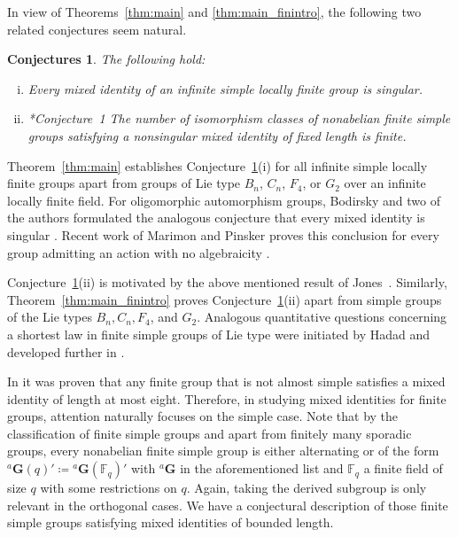 \documentclass[a4paper,12pt]{amsproc}
\theoremstyle{plain}
\newtheorem{conjsintro}[thmintro]{Conjectures}
\theoremstyle{definition}
\begin{document}
In view of Theorems~\ref{thm:main} and \ref{thm:main_finintro}, the following two related conjectures seem natural.

\begin{conjsintro}\label{conj:main_lfsg}
The following hold:
\begin{enumerate}[(i)]
\item Every mixed identity of an infinite simple locally finite group is singular.
\item \cite{bradfordschneiderthom2023non}*{Conjecture~1}
The number of isomorphism classes of nonabelian finite simple groups satisfying a nonsingular mixed identity of fixed length is finite.
\end{enumerate}
\end{conjsintro}

Theorem~\ref{thm:main} establishes Conjecture~\ref{conj:main_lfsg}(i) for all  infinite simple locally finite groups apart from  groups of Lie type $B_n$, $C_n$, $F_4$, or $G_2$ over an infinite locally finite field.
For oligomorphic automorphism groups, Bodirsky and two of the authors formulated the analogous conjecture that every mixed identity is singular \cite{bodirskyschneiderthom2025mixed}. Recent work of Marimon and Pinsker proves this conclusion for every group admitting an action with no algebraicity \cite{marimonpinsker2026all}.

Conjecture~\ref{conj:main_lfsg}(ii) is motivated by the above mentioned result of Jones~\cite{jones1974varieties}. Similarly, Theorem~\ref{thm:main_finintro} proves Conjecture~\ref{conj:main_lfsg}(ii) apart from simple groups of the Lie types $B_n, C_n, F_4$, and $G_2$. Analogous quantitative questions concerning a shortest law in finite
simple groups of Lie type were initiated by Hadad 
\cite{hadad2011shortest} and developed further in 
\cites{kozmathom2016divisibility,thom2017length,bradfordthom2026short}.

In \cite{bradfordschneiderthom2023length} it was proven that any finite group that is 
not almost simple satisfies a mixed identity of length at most eight. 
Therefore, in studying mixed identities for finite groups, attention naturally focuses 
on the simple case.
Note that by the classification of finite simple groups and apart from finitely many sporadic groups, every nonabelian finite simple group is either alternating or of the form ${}^a\mathbf{G}(q)'\coloneqq {}^a\mathbf{G}(\mathbb F_q)'$ with ${}^a\mathbf G$ in the aforementioned list and $\mathbb F_q$ a finite field of size $q$ with some restrictions on $q$. Again, taking the derived subgroup is only relevant in the orthogonal cases. We have a conjectural description of those finite simple groups satisfying 
mixed identities of bounded length.
\end{document}
